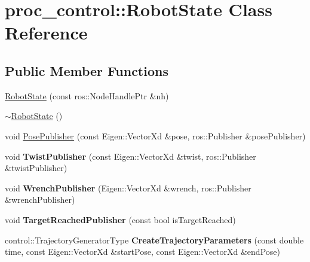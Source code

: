 \hypertarget{classproc__control_1_1_robot_state}{}\section{proc\+\_\+control\+:\+:Robot\+State Class Reference}
\label{classproc__control_1_1_robot_state}
\subsection*{Public Member Functions}
\begin{DoxyCompactItemize}
\item 
\hyperlink{classproc__control_1_1_robot_state_a33e83cff4f22db303edfff3ea7e73d85}{Robot\+State} (const ros\+::\+Node\+Handle\+Ptr \&nh)
\item 
\hyperlink{classproc__control_1_1_robot_state_ad00656ab86c7029e2e61531992035688}{$\sim$\+Robot\+State} ()
\item 
void \hyperlink{classproc__control_1_1_robot_state_a59212defe96d3527a2bf1cc8b68816ab}{Pose\+Publisher} (const Eigen\+::\+Vector\+Xd \&pose, ros\+::\+Publisher \&pose\+Publisher)
\item 
\mbox{\label{classproc__control_1_1_robot_state_ac1a65f39109fba16e8ab789e91a60e72}} 
void {\bfseries Twist\+Publisher} (const Eigen\+::\+Vector\+Xd \&twist, ros\+::\+Publisher \&twist\+Publisher)
\item 
\mbox{\label{classproc__control_1_1_robot_state_aa1566bb7dcfd6797b968e86c42ae57de}} 
void {\bfseries Wrench\+Publisher} (Eigen\+::\+Vector\+Xd \&wrench, ros\+::\+Publisher \&wrench\+Publisher)
\item 
\mbox{\label{classproc__control_1_1_robot_state_af211023d1d9e7c874857eead96c24183}} 
void {\bfseries Target\+Reached\+Publisher} (const bool is\+Target\+Reached)
\item 
\mbox{\label{classproc__control_1_1_robot_state_a08acd0ded61925bde2b1d8d0cb9c6e52}} 
control\+::\+Trajectory\+Generator\+Type {\bfseries Create\+Trajectory\+Parameters} (const double time, const Eigen\+::\+Vector\+Xd \&start\+Pose, const Eigen\+::\+Vector\+Xd \&end\+Pose)
\item 

\end{DoxyCompactItemize}
